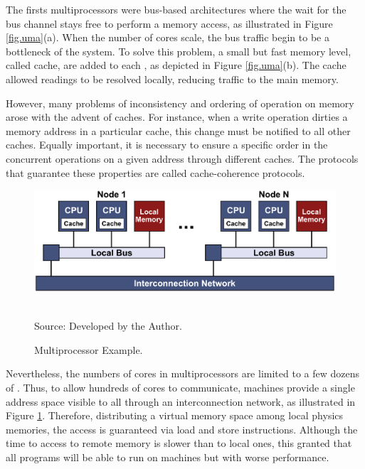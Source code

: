 			The firsts \uma multiprocessors were bus-based architectures where
			the \cpu wait for the bus channel stays free to perform a memory
			access, as illustrated in Figure \ref{fig.uma}(a).
			When the number of cores scale, the bus traffic begin to be a
			bottleneck of the system.
			To solve this problem, a small but fast memory level, called cache,
			are added to each \cpu, as depicted in Figure \ref{fig.uma}(b).
			The cache allowed readings to be resolved locally, reducing traffic
			to the main memory.

			However, many problems of inconsistency and ordering of operation
			on memory arose with the advent of caches.
			For instance, when a write operation dirties a memory address in
			a particular cache, this change must be notified to all other caches.
			Equally important, it is necessary to ensure a specific order in
			the concurrent operations on a given address through different caches.
			The protocols that guarantee these properties are called cache-coherence protocols.

			\begin{figure}[h]
				\centering
				\caption{\numa Multiprocessor Example.}

				\includegraphics[width=.8\textwidth]{images/numa.pdf}

				\\ \vspace{0.3cm}
				Source: Developed by the Author.

				\label{fig.numa}
			\end{figure}

			Nevertheless, the numbers of cores in \uma multiprocessors are limited
			to a few dozens of \cpus.
			Thus, to allow hundreds of cores to communicate, \numa machines provide
			a single address space visible to all \cpus through an interconnection
			network,  as illustrated in Figure \ref{fig.numa}.
			Therefore, distributing a virtual memory space among local physics memories,
			the access is guaranteed via load and store instructions.
			Although the time to access to remote memory is slower than to local ones,
			this granted that all \uma programs will be able to run on \numa machines
			but with worse performance.

